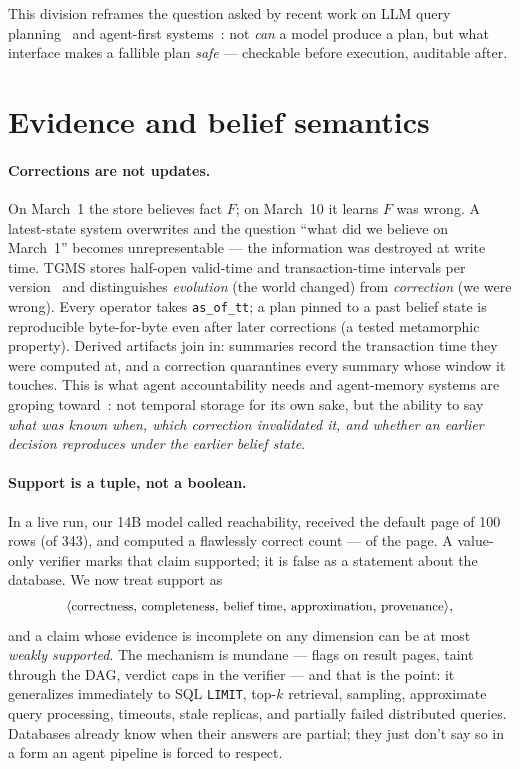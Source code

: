 \documentclass[sigconf]{acmart}
\begin{document}
This division reframes the question asked by recent work on LLM query
planning~\cite{urban2024caesura,wang2025aop} and agent-first
systems~\cite{liu2026agentfirst}: not \emph{can} a model produce a plan,
but what interface makes a fallible plan \emph{safe} --- checkable
before execution, auditable after.

\section{Evidence and belief semantics}
\label{sec:evidence}

\paragraph{Corrections are not updates.}
On March~1 the store believes fact $F$; on March~10 it learns $F$ was
wrong. A latest-state system overwrites and the question ``what did we
believe on March~1'' becomes unrepresentable --- the information was
destroyed at write time. TGMS stores half-open valid-time and
transaction-time intervals per version~\cite{snodgrass1999} and
distinguishes \emph{evolution} (the world changed) from \emph{correction}
(we were wrong). Every operator takes \texttt{as\_of\_tt}; a plan pinned
to a past belief state is reproducible byte-for-byte even after later
corrections (a tested metamorphic property). Derived artifacts join in:
summaries record the transaction time they were computed at, and a
correction quarantines every summary whose window it touches. This is
what agent accountability needs and agent-memory systems are groping
toward~\cite{zep2025,wang2026toki}: not temporal storage for its own
sake, but the ability to say \emph{what was known when, which correction
invalidated it, and whether an earlier decision reproduces under the
earlier belief state}.

\paragraph{Support is a tuple, not a boolean.}
In a live run, our 14B model called reachability, received the default
page of 100 rows (of 343), and computed a flawlessly correct count ---
of the page. A value-only verifier marks that claim supported; it is
false as a statement about the database. We now treat support as
\[
\small
\langle \text{correctness},\, \text{completeness},\, \text{belief time},\,
\text{approximation},\, \text{provenance} \rangle,
\]
and a claim whose evidence is incomplete on any dimension can be at most
\emph{weakly supported}. The mechanism is mundane --- flags on result
pages, taint through the DAG, verdict caps in the verifier --- and that
is the point: it generalizes immediately to SQL \texttt{LIMIT}, top-$k$
retrieval, sampling, approximate query processing, timeouts, stale
replicas, and partially failed distributed queries. Databases already
know when their answers are partial; they just don't say so in a form an
agent pipeline is forced to respect.
\end{document}
